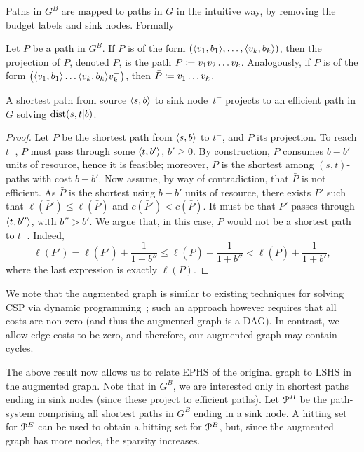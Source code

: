 Paths in $G^B$ are mapped to paths in $G$ in the intuitive way, by removing the budget labels and sink nodes. Formally
\begin{definition}
Let $P$ be a path in $G^B$.
If $P$ is of the form $\prn*{\pp{v_1,b_1},\ldots,\pp{v_k,b_k}}$, then the projection of $P$, denoted $\bar P$, is the path $\bar P\defeq v_1v_2\ldots v_k$.
Analogously, if $P$ is of the form $\prn*{\pp{v_1,b_1}\ldots\pp{v_k,b_k}v_{k}^-}$, then $\bar P\defeq v_1\ldots v_{k}$. 
\end{definition}


\begin{proposition}\label{prop:shorteffic}
A shortest path from source $\pp{s,b}$ to sink node~$t^-$ projects to an efficient path in $G$ solving $\dist(s,t|b)$. 
\end{proposition}
\begin{proof}
Let $P$ be the shortest path from $\pp{s,b}$ to $t^-$, and $\bar P$ its projection.
To reach $t^-$, $P$ must pass through some $\pp{t,b'}$, $b'\geq 0$.
By construction, $P$ consumes $b-b'$ units of resource, hence it is feasible; moreover, $\bar P$ is the shortest among $(s,t)$-paths with cost $b-b'$.
Now assume, by way of contradiction, that $\bar P$ is not efficient.
As $\bar P$ is the shortest using $b-b'$ units of resource, there exists $P'$ such that $\ell(\bar P')\leq \ell(\bar P)$ and $c(\bar P')< c(\bar P)$.
It must be that $P'$ passes through $\pp{t,b''}$, with $b''>b'$.
We argue that, in this case, $P$ would not be a shortest path to $t^-$.
Indeed, 
\[
\ell(P')=\ell(\bar P')+\frac{1}{1+b''}
\leq \ell(\bar P) +\frac{1}{1+b''}
< \ell(\bar P) +\frac{1}{1+b'},
\]
where the last expression is exactly $\ell(P)$.
\end{proof}

We note that the augmented graph is similar to existing techniques for solving CSP via dynamic programming~\cite{alex_bicriteria}; such an approach however requires that all costs are non-zero (and thus the augmented graph is a DAG).
In contrast, we allow edge costs to be zero, and therefore, our augmented graph may contain cycles. 

The above result now allows us to relate EPHS of the original graph to LSHS in the augmented graph.
Note that in $G^B$, we are interested only in shortest paths ending in sink nodes (since these project to efficient paths). 
Let $\calP^B$ be the path-system comprising all shortest paths in $G^B$ ending in a sink node.
A hitting set for $\PE$ can be used to obtain a hitting set for $\calP^B$, but, since the augmented graph has more nodes, the sparsity increases.
 
